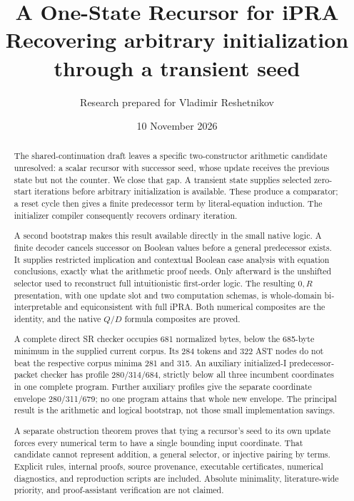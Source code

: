 \documentclass[11pt,letterpaper]{article}
\title{\color{ink}\bfseries A One-State Recursor for iPRA\\[7pt]
\large Recovering arbitrary initialization through a transient seed}
\author{Research prepared for Vladimir Reshetnikov}
\date{10 November 2026}
\theoremstyle{definition}\newtheorem{definition}[theorem]{Definition}
\theoremstyle{remark}\newtheorem{remark}[theorem]{Remark}
\begin{document}
\maketitle
\begin{abstract}
The shared-continuation draft leaves a specific two-constructor arithmetic
candidate unresolved: a scalar recursor with successor seed, whose update
receives the previous state but not the counter. We close that gap. A
transient state supplies selected zero-start iterations before arbitrary
initialization is available. These produce a comparator; a reset cycle
then gives a finite predecessor term by literal-equation induction.
The initializer compiler consequently recovers ordinary iteration.

A second bootstrap makes this result available directly in the small
native logic. A finite decoder cancels successor on Boolean values before
a general predecessor exists. It supplies restricted implication and
contextual Boolean case analysis with equation conclusions, exactly what
the arithmetic proof needs. Only afterward is the unshifted selector used
to reconstruct full intuitionistic first-order logic. The resulting
$0,R$ presentation, with one update slot and two computation schemas,
is whole-domain bi-interpretable and equiconsistent with full iPRA.
Both numerical composites are the identity, and the native $Q/D$ formula
composites are proved.

A complete direct SR checker occupies 681 normalized bytes, below the
685-byte minimum in the supplied current corpus. Its 284 tokens and
322 AST nodes do not beat the respective corpus minima 281 and 315.
An auxiliary initialized-I predecessor-packet checker has profile
280/314/684, strictly below all three incumbent coordinates in one complete
program. Further auxiliary profiles give the separate coordinate envelope
280/311/679; no one program attains that whole new envelope. The principal result is the arithmetic and logical bootstrap,
not those small implementation savings.

A separate obstruction theorem proves that tying a recursor's seed to its
own update forces every numerical term to have a single bounding input
coordinate. That candidate cannot represent addition, a general selector,
or injective pairing by terms. Explicit rules, internal proofs, source
provenance, executable certificates, numerical diagnostics, and reproduction
scripts are included. Absolute minimality, literature-wide priority, and
proof-assistant verification are not claimed.
\end{abstract}
\clearpage
\setcounter{tocdepth}{2}\tableofcontents
\clearpage










\clearpage
\appendix
\end{document}
